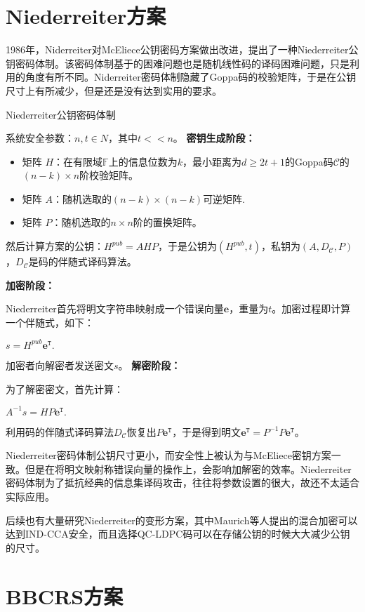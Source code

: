 \section{Niederreiter方案}
1986年，Niderreiter对McEliece公钥密码方案做出改进，提出了一种Niederreiter公钥密码体制。该密码体制基于的困难问题也是随机线性码的译码困难问题，只是利用的角度有所不同。Niderreiter密码体制隐藏了Goppa码的校验矩阵，于是在公钥尺寸上有所减少，但是还是没有达到实用的要求。

\begin{breakablealgorithm}
	\small
	\renewcommand{\algorithmicrequire}{\textbf{Input:}}
	\renewcommand{\algorithmicensure}{\textbf{Output:}}
	\caption{Niederreiter公钥密码体制}
	\label{alg:NiederreiterKeyGen}
	\begin{algorithmic}	
		\State
		系统安全参数：$n,t \in N$，其中$t << n$。
		\State
		\textbf{密钥生成阶段：}
		
		\begin{itemize}
			\item 矩阵 $H$：在有限域$\mathbb{F}$上的信息位数为$k$，最小距离为$d \geq 2t + 1$的Goppa码$\mathcal{C}$的$(n-k) \times n$阶校验矩阵。
			\item 矩阵 $A$：随机选取的$(n-k) \times (n-k)$可逆矩阵.
			\item 矩阵 $P$：随机选取的$n \times n$阶的置换矩阵。			
		\end{itemize}
	
		然后计算方案的公钥：$H^{pub} = AHP$，于是公钥为$(H^{pub}, t)$，私钥为$(A,D_\mathcal{C},P)$，$D_\mathcal{C}$是码的伴随式译码算法。
		
		\State
		\textbf{加密阶段：}
		
		Niederreiter首先将明文字符串映射成一个错误向量$\mathbf{e}$，重量为$t$。加密过程即计算一个伴随式，如下：
		
		\begin{center}
			$s = H^{pub}\mathbf{e}^\mathtt{T}.$
		\end{center}
		
		加密者向解密者发送密文$s$。
		\State
		\textbf{解密阶段：}
		
		为了解密密文，首先计算：
		\begin{center}
			$A^{-1}s = HP\mathbf{e}^\mathtt{T}.$
		\end{center}
	    利用码的伴随式译码算法$D_\mathcal{C}$恢复出$P\mathbf{e}^\mathtt{T}$，于是得到明文$\mathbf{e}^\mathtt{T} = P^{-1}P\mathbf{e}^\mathtt{T}$。		
	\end{algorithmic}
\end{breakablealgorithm}

Niederreiter密码体制公钥尺寸更小，而安全性上被认为与McEliece密钥方案一致。但是在将明文映射称错误向量的操作上，会影响加解密的效率。Niederreiter密码体制为了抵抗经典的信息集译码攻击，往往将参数设置的很大，故还不太适合实际应用。

后续也有大量研究Niederreiter的变形方案，其中Maurich等人提出的混合加密可以达到IND-CCA安全，而且选择QC-LDPC码可以在存储公钥的时候大大减少公钥的尺寸。
\section{BBCRS方案}


